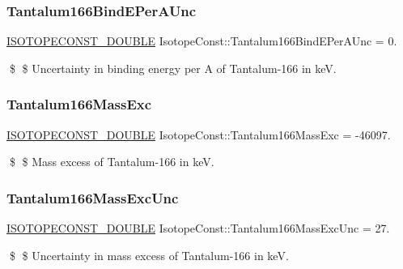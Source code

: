 \subsubsection{\texorpdfstring{Tantalum166\+Bind\+E\+Per\+A\+Unc}{Tantalum166BindEPerAUnc}}
{\footnotesize\ttfamily \mbox{\hyperlink{group___isotope_const-_macros_ga8f45a7272ce02c0b4c65c44636ed719a}{I\+S\+O\+T\+O\+P\+E\+C\+O\+N\+S\+T\+\_\+\+D\+O\+U\+B\+LE}} Isotope\+Const\+::\+Tantalum166\+Bind\+E\+Per\+A\+Unc = 0.}

\$ \$ Uncertainty in binding energy per A of Tantalum-\/166 in keV. \mbox{\label{group___isotope_const-_tantalum-_ta166_ga7f650950966f033345db8e5718199d5e}} 
\subsubsection{\texorpdfstring{Tantalum166\+Mass\+Exc}{Tantalum166MassExc}}
{\footnotesize\ttfamily \mbox{\hyperlink{group___isotope_const-_macros_ga8f45a7272ce02c0b4c65c44636ed719a}{I\+S\+O\+T\+O\+P\+E\+C\+O\+N\+S\+T\+\_\+\+D\+O\+U\+B\+LE}} Isotope\+Const\+::\+Tantalum166\+Mass\+Exc = -\/46097.}

\$ \$ Mass excess of Tantalum-\/166 in keV. \mbox{\label{group___isotope_const-_tantalum-_ta166_ga9df20a10465fc12960819320b108d27e}} 
\subsubsection{\texorpdfstring{Tantalum166\+Mass\+Exc\+Unc}{Tantalum166MassExcUnc}}
{\footnotesize\ttfamily \mbox{\hyperlink{group___isotope_const-_macros_ga8f45a7272ce02c0b4c65c44636ed719a}{I\+S\+O\+T\+O\+P\+E\+C\+O\+N\+S\+T\+\_\+\+D\+O\+U\+B\+LE}} Isotope\+Const\+::\+Tantalum166\+Mass\+Exc\+Unc = 27.}

\$ \$ Uncertainty in mass excess of Tantalum-\/166 in keV. \mbox{\label{group___isotope_const-_tantalum-_ta166_gab0aa57173f3ecf04b7bcfd99d4b43d21}} 

